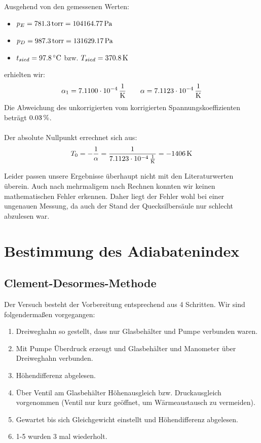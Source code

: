 \documentclass[a4paper,titlepage]{scrartcl}
\numberwithin{equation}{section}
\begin{document}
Ausgehend von den gemessenen Werten:
\begin{itemize}
\item $p_E = \unit[781.3]{torr}=\unit[104164.77]{Pa}$
\item $p_D = \unit[987.3]{torr}=\unit[131629.17]{Pa}$
\item $t_{sied} = \unit[97.8]{^{\circ} C}$ bzw. $T_{sied} = \unit[370.8]{K}$
\end{itemize}
erhielten wir:
\begin{equation*}
\alpha_1=\unit[7.1100 \cdot 10^{-4}]{\frac{1}{K}} \quad \quad \alpha=\unit[7.1123 \cdot 10^{-4}]{\frac{1}{K}}
\end{equation*}
Die Abweichung des unkorrigierten vom korrigierten Spannungskoeffizienten beträgt $\unit[0.03]{\%}$.\\ \\
Der absolute Nullpunkt errechnet sich aus:
\begin{equation*}
T_0= - \frac{1}{\alpha}=\frac{1}{\unit[7.1123 \cdot 10^{-4}]{\frac{1}{K}}}= - \unit[1406]{K}
\end{equation*}

Leider passen unsere Ergebnisse überhaupt nicht mit den Literaturwerten überein. Auch nach mehrmaligem nach Rechnen konnten wir keinen mathematischen Fehler erkennen. Daher liegt der Fehler wohl bei einer ungenauen Messung, da auch der Stand der Quecksilbersäule nur schlecht abzulesen war.

\newpage

\section{Bestimmung des Adiabatenindex}
\subsection{Clement-Desormes-Methode}
Der Versuch besteht der Vorbereitung entsprechend aus 4 Schritten.  Wir sind folgendermaßen vorgegangen:
\begin{enumerate}
\item Dreiweghahn so gestellt, dass nur Glasbehälter und Pumpe verbunden waren.
\item Mit Pumpe Überdruck erzeugt und Glasbehälter und Manometer über Dreiweghahn verbunden.
\item Höhendifferenz abgelesen.
\item Über Ventil am Glasbehälter Höhenausgleich bzw. Druckausgleich vorgenommen (Ventil nur kurz geöffnet, um Wärmeaustausch zu vermeiden).
\item Gewartet bis sich Gleichgewicht einstellt und Höhendifferenz abgelesen.
\item 1-5 wurden 3 mal wiederholt.
\end{enumerate}
\end{document}

